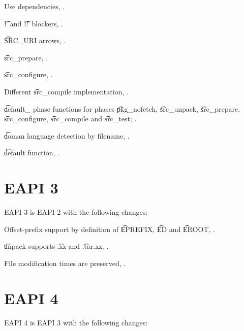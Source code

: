 \begin{compactitem}
\item Use dependencies, .
\item \t{!}\ and \t{!!}\ blockers, .
\item \t{SRC_URI} arrows, .
\item \t{src_prepare}, .
\item \t{src_configure}, .
\item Different \t{src_compile} implementation, .
\item \t{default_} phase functions for phases \t{pkg_nofetch}, \t{src_unpack}, \t{src_prepare},
    \t{src_configure}, \t{src_compile} and \t{src_test}; .
\item \t{doman} language detection by filename, .
\item \t{default} function, .
\end{compactitem}

\section{EAPI 3}

EAPI 3 is EAPI 2 with the following changes:
\begin{compactitem}
\item Offset-prefix support by definition of \t{EPREFIX}, \t{ED} and \t{EROOT},
    .
\item \t{unpack} supports \t{.xz} and \t{.tar.xz}, .
\item File modification times are preserved, .
\end{compactitem}

\section{EAPI 4}

EAPI 4 is EAPI 3 with the following changes:

